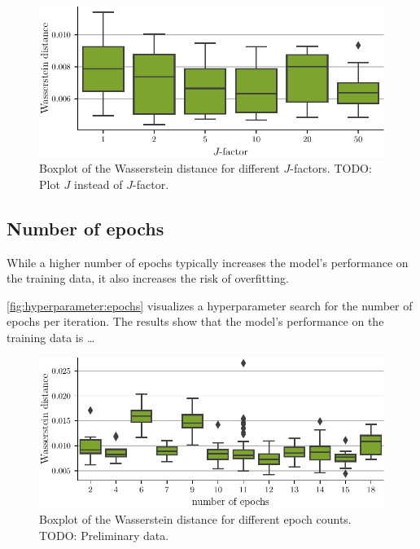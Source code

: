 \begin{figure}
  \centering
  \includegraphics[scale=1]{content/plots/hyperparam/J_factor_vs_wd_boxplot_lessheight.pdf}
  \caption{
    Boxplot of the Wasserstein distance for different $J$-factors.
    TODO: Plot $J$ instead of $J$-factor.
    }
  \label{fig:hyperparameter:J}
\end{figure}


\subsection{Number of epochs}
While a higher number of epochs typically increases the model's performance on the training data,
it also increases the risk of overfitting.

\autoref{fig:hyperparameter:epochs} visualizes a hyperparameter search for the number of epochs per \dsea{} iteration.
The results show that the model's performance on the training data is …

\begin{figure}
  \centering
  \includegraphics[width=\textwidth]{content/plots/hyperparam/num_epochs_vs_wd_boxplot_lessheight.pdf}
  \caption{Boxplot of the Wasserstein distance for different epoch counts. TODO: Preliminary data.}
  \label{fig:hyperparameter:epochs}
\end{figure}


